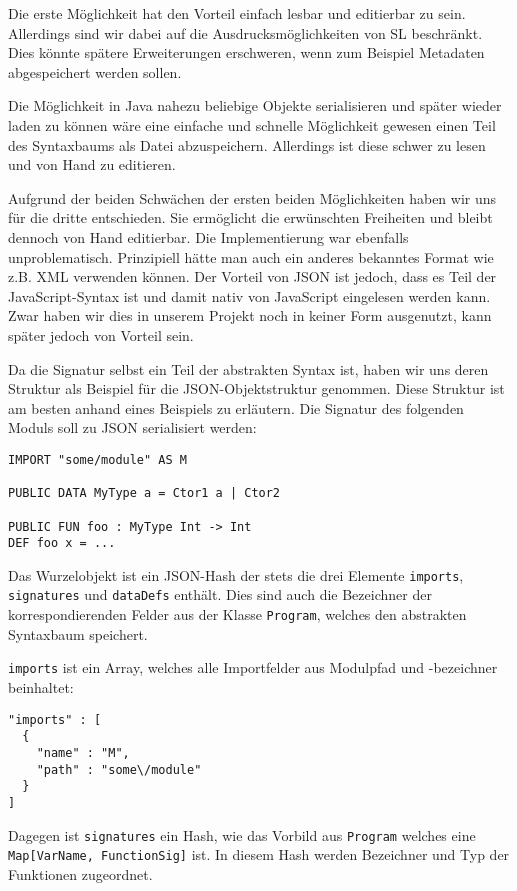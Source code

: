 \documentclass[runningheads]{llncs}
\begin{document}
Die erste Möglichkeit hat den Vorteil einfach lesbar und editierbar zu sein. Allerdings sind wir dabei auf die Ausdrucksmöglichkeiten von SL beschränkt. Dies könnte spätere Erweiterungen erschweren, wenn zum Beispiel Metadaten abgespeichert werden sollen.

Die Möglichkeit in Java nahezu beliebige Objekte serialisieren und später wieder laden zu können wäre eine einfache und schnelle Möglichkeit gewesen einen Teil des Syntaxbaums als Datei abzuspeichern. Allerdings ist diese schwer zu lesen und von Hand zu editieren.

Aufgrund der beiden Schwächen der ersten beiden Möglichkeiten haben wir uns für die dritte entschieden. Sie ermöglicht die erwünschten Freiheiten und bleibt dennoch von Hand editierbar. Die Implementierung war ebenfalls unproblematisch. Prinzipiell hätte man auch ein anderes bekanntes Format wie z.B. XML verwenden können. Der Vorteil von JSON ist jedoch, dass es Teil der JavaScript-Syntax ist und damit nativ von JavaScript eingelesen werden kann. Zwar haben wir dies in unserem Projekt noch in keiner Form ausgenutzt, kann später jedoch von Vorteil sein.

Da die Signatur selbst ein Teil der abstrakten Syntax ist, haben wir uns deren Struktur als Beispiel für die JSON-Objektstruktur genommen. Diese Struktur ist am besten anhand eines Beispiels zu erläutern. Die Signatur des folgenden Moduls soll zu JSON serialisiert werden:

\begin{verbatim}
IMPORT "some/module" AS M

PUBLIC DATA MyType a = Ctor1 a | Ctor2

PUBLIC FUN foo : MyType Int -> Int
DEF foo x = ...
\end{verbatim}

Das Wurzelobjekt ist ein JSON-Hash der stets die drei Elemente \verb|imports|, \verb|signatures| und \verb|dataDefs| enthält. Dies sind auch die Bezeichner der korrespondierenden Felder aus der Klasse \verb|Program|, welches den abstrakten Syntaxbaum speichert.

\verb|imports| ist ein Array, welches alle Importfelder aus Modulpfad und -bezeichner beinhaltet:

\begin{verbatim}
"imports" : [
  {
    "name" : "M",
    "path" : "some\/module"
  }
]
\end{verbatim}

Dagegen ist \verb|signatures| ein Hash, wie das Vorbild aus \verb|Program| welches eine \verb|Map[VarName, FunctionSig]| ist. In diesem Hash werden Bezeichner und Typ der Funktionen zugeordnet.
\end{document}

